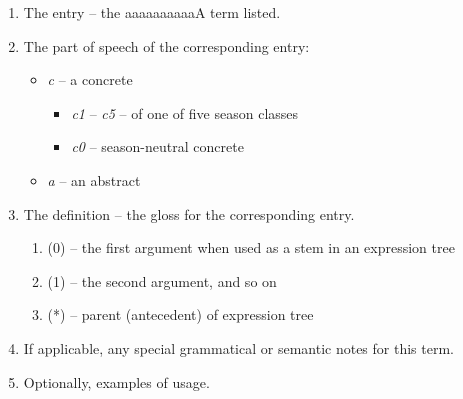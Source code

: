 \documentclass{book}
\newcommand{\lname}{aaaaaaaaaaA}
\begin{document}
\begin{enumerate}
    \item The entry -- the \lname{} term listed.
    \item The part of speech of the corresponding entry:
    \begin{itemize}
        \item \textit{c} -- a concrete
        \begin{itemize}
            \item \textit{c1} -- \textit{c5} -- of one of five season classes
            \item \textit{c0} -- season-neutral concrete
        \end{itemize}
        \item \textit{a} -- an abstract
    \end{itemize}
    \item The definition -- the gloss for the corresponding entry.
    \begin{enumerate}
        \item (0) -- the first argument when used as a stem in an expression tree
        \item (1) -- the second argument, and so on
        \item (*) -- parent (antecedent) of expression tree
    \end{enumerate}
    \item If applicable, any special grammatical or semantic notes for this term.
    \item Optionally, examples of usage.
\end{enumerate}

\begin{multicols}{2}
    
\end{multicols}
\end{document}
